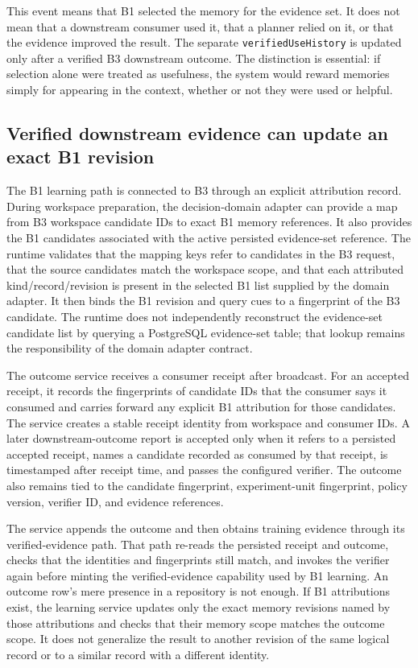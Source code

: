 This event means that B1 selected the memory for the evidence set. It does not mean that a downstream consumer used it, that a planner relied on it, or that the evidence improved the result. The separate \texttt{verifiedUseHistory} is updated only after a verified B3 downstream outcome. The distinction is essential: if selection alone were treated as usefulness, the system would reward memories simply for appearing in the context, whether or not they were used or helpful.

\subsection{Verified downstream evidence can update an exact B1 revision}
\label{subsec:ch21-b1-outcome}

The B1 learning path is connected to B3 through an explicit attribution record. During workspace preparation, the decision-domain adapter can provide a map from B3 workspace candidate IDs to exact B1 memory references. It also provides the B1 candidates associated with the active persisted evidence-set reference. The runtime validates that the mapping keys refer to candidates in the B3 request, that the source candidates match the workspace scope, and that each attributed kind/record/revision is present in the selected B1 list supplied by the domain adapter. It then binds the B1 revision and query cues to a fingerprint of the B3 candidate. The runtime does not independently reconstruct the evidence-set candidate list by querying a PostgreSQL evidence-set table; that lookup remains the responsibility of the domain adapter contract.

The outcome service receives a consumer receipt after broadcast. For an accepted receipt, it records the fingerprints of candidate IDs that the consumer says it consumed and carries forward any explicit B1 attribution for those candidates. The service creates a stable receipt identity from workspace and consumer IDs. A later downstream-outcome report is accepted only when it refers to a persisted accepted receipt, names a candidate recorded as consumed by that receipt, is timestamped after receipt time, and passes the configured verifier. The outcome also remains tied to the candidate fingerprint, experiment-unit fingerprint, policy version, verifier ID, and evidence references.

The service appends the outcome and then obtains training evidence through its verified-evidence path. That path re-reads the persisted receipt and outcome, checks that the identities and fingerprints still match, and invokes the verifier again before minting the verified-evidence capability used by B1 learning. An outcome row's mere presence in a repository is not enough. If B1 attributions exist, the learning service updates only the exact memory revisions named by those attributions and checks that their memory scope matches the outcome scope. It does not generalize the result to another revision of the same logical record or to a similar record with a different identity.

